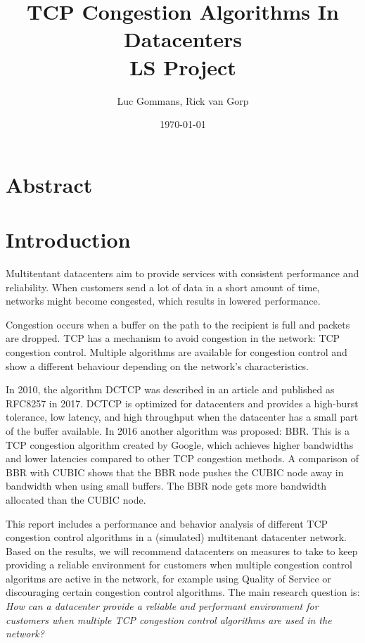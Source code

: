 \documentclass{article}
\title{TCP Congestion Algorithms In Datacenters \\
	\vspace{0.3cm}
	{\large LS Project}
}
\date{\today{}}
\author{Luc Gommans, Rick van Gorp}
\begin{document}
\maketitle

\section{Abstract}


\section{Introduction}


Multitentant datacenters aim to provide services with consistent performance
and reliability. When customers send a lot of data in a short amount of time,
networks might become congested, which results in lowered performance.

Congestion occurs when a buffer on the path to the recipient is full and
packets are dropped. TCP has a mechanism to avoid congestion in the network:
TCP congestion control. Multiple algorithms are available for congestion
control and show a different behaviour depending on the network's
characteristics.

In 2010, the algorithm DCTCP was described in an
article\cite{dctcp-congestion-original} and published as RFC8257 in
2017\cite{dctcp-congestion}. DCTCP is optimized for datacenters and provides a
high-burst tolerance, low latency, and high throughput when the datacenter has
a small part of the buffer available\cite{dctcp-congestion}. In 2016 another
algorithm was proposed: BBR. This is a TCP congestion algorithm created by
Google, which achieves higher bandwidths and lower latencies compared to other
TCP congestion methods\cite{bbr-congestion}. A comparison of BBR with
CUBIC\cite{bbr-congestion-comparison} shows that the BBR node pushes the CUBIC
node away in bandwidth when using small buffers. The BBR node gets more
bandwidth allocated than the CUBIC node.

This report includes a performance and behavior analysis of different TCP congestion control algorithms in a (simulated) multitenant datacenter network. Based on the results, we will recommend datacenters on measures to take to keep providing a reliable environment for customers when multiple congestion control algoritms are active in the network, for example using Quality of Service or discouraging certain congestion control algorithms. The main research question is: {\it How can a datacenter provide a reliable and performant environment for customers when multiple TCP congestion control algorithms are used in the
network?}
\end{document}

